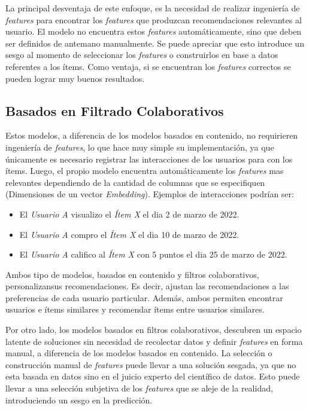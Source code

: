 \documentclass[11pt,a4paper,twoside]{thesis}
\begin{document}
La principal desventaja de este enfoque, es la necesidad de realizar ingeniería
de \textit{features} para encontrar los \textit{features} que produzcan
recomendaciones relevantes al usuario. El modelo no encuentra estos
\textit{features} automáticamente, sino que deben ser definidos de antemano
manualmente. Se puede apreciar que esto introduce un sesgo al momento de
seleccionar los \textit{features} o construirlos en base a datos referentes a
los ítems. Como ventaja, si se encuentran los \textit{features} correctos se
pueden lograr muy buenos resultados.

\subsection{Basados en Filtrado Colaborativos}

Estos modelos, a diferencia de los modelos basados en contenido, no requirieren
ingeniería de \textit{features}, lo que hace muy simple su implementación, ya
que únicamente es necesario registrar las interacciones de los usuarios para
con los ítems. Luego, el propio modelo encuentra automáticamente los
\textit{features} mas relevantes dependiendo de la cantidad de columnas que se
especifiquen (Dimensiones de un vector \textit{Embedding}). Ejemplos de
interacciones podrían ser:

\begin{itemize}
	\item El \textit{Usuario A} visualizo el \textit{Ítem X} el dia 2 de marzo de 2022.
	\item El \textit{Usuario A} compro el \textit{Ítem X} el dia 10 de marzo de 2022.
	\item El \textit{Usuario A} califico al \textit{Ítem X} con 5 puntos el dia 25 de
	      marzo de 2022.
\end{itemize}

Ambos tipo de modelos, basados en contenido y filtros colaborativos,
personalizansus recomendaciones. Es decir, ajustan las recomendaciones a las
preferencias de cada usuario particular. Además, ambos permiten encontrar
usuarios e ítems similares y recomendar ítems entre usuarios similares.

Por otro lado, los modelos basados en filtros colaborativos, descubren un
espacio latente de soluciones sin necesidad de recolectar datos y definir
\textit{features} en forma manual, a diferencia de los modelos basados en
contenido. La selección o construcción manual de \textit{features} puede llevar
a una solución sesgada, ya que no esta basada en datos sino en el juicio
experto del científico de datos. Esto puede llevar a una selección subjetiva de
los \textit{features} que se aleje de la realidad, introduciendo un sesgo en la
predicción.
\end{document}
